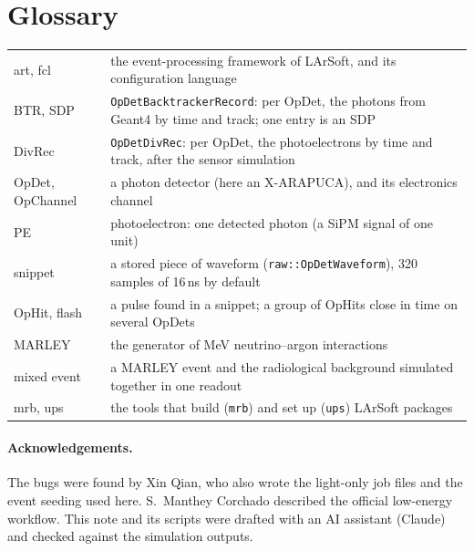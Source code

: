 \documentclass[10pt]{article}
\newcommand{\code}[1]{\texttt{#1}}
\begin{document}
\section{Glossary}
\begin{tabularx}{\linewidth}{@{}l X@{}}
art, fcl & the event-processing framework of LArSoft, and its configuration language \\
BTR, SDP & \code{OpDetBacktrackerRecord}: per OpDet, the photons from Geant4 by time and track; one entry is an SDP \\
DivRec & \code{OpDetDivRec}: per OpDet, the photoelectrons by time and track, after the sensor simulation \\
OpDet, OpChannel & a photon detector (here an X-ARAPUCA), and its electronics channel \\
PE & photoelectron: one detected photon (a SiPM signal of one unit) \\
snippet & a stored piece of waveform (\code{raw::OpDetWaveform}), 320 samples of 16\,ns by default \\
OpHit, flash & a pulse found in a snippet; a group of OpHits close in time on several OpDets \\
MARLEY & the generator of MeV neutrino--argon interactions \\
mixed event & a MARLEY event and the radiological background simulated together in one readout \\
mrb, ups & the tools that build (\code{mrb}) and set up (\code{ups}) LArSoft packages \\
\end{tabularx}

\paragraph{Acknowledgements.} The bugs were found by Xin Qian, who also wrote the light-only job files and the event
seeding used here. S.~Manthey Corchado described the official low-energy workflow. This note and its scripts were
drafted with an AI assistant (Claude) and checked against the simulation outputs.
\end{document}
